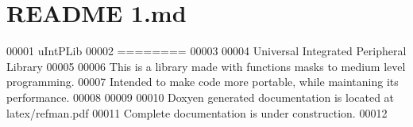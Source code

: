 \hypertarget{_r_e_a_d_m_e_011_8md_source}{\section{R\-E\-A\-D\-M\-E 1.md}
}

\begin{DoxyCode}
00001 uIntPLib
00002 ========
00003 
00004 Universal Integrated Peripheral Library
00005 
00006 This is a library made with functions masks to medium level programming.
00007 Intended to make code more portable, \textcolor{keywordflow}{while} maintaning its performance.
00008 
00009 
00010 Doxyen generated documentation is located at latex/refman.pdf
00011 Complete documentation is under construction.
00012 
\end{DoxyCode}
